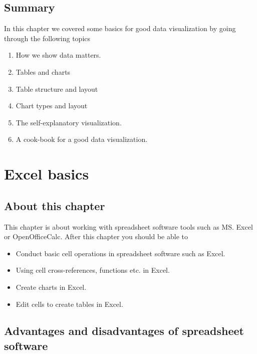 \documentclass[]{book}
\providecommand{\tightlist}{%
  \setlength{\itemsep}{0pt}\setlength{\parskip}{0pt}}
\begin{document}
\hypertarget{summary-11}{%
\section{Summary}\label{summary-11}}

In this chapter we covered some basics for good data visualization by going through the following topics

\begin{enumerate}
\def\labelenumi{\arabic{enumi}.}
\tightlist
\item
  How we show data matters.
\item
  Tables and charts
\item
  Table structure and layout
\item
  Chart types and layout
\item
  The self-explanatory visualization.
\item
  A cook-book for a good data visualization.
\end{enumerate}

\hypertarget{excel-basics}{%
\chapter{Excel basics}\label{excel-basics}}

\hypertarget{about-this-chapter-12}{%
\section{About this chapter}\label{about-this-chapter-12}}

This chapter is about working with spreadsheet software tools such as MS. Excel or OpenOfficeCalc. After this chapter you should be able to

\begin{itemize}
\tightlist
\item
  Conduct basic cell operations in spreadsheet software such as Excel.
\item
  Using cell cross-references, functions etc. in Excel.
\item
  Create charts in Excel.
\item
  Edit cells to create tables in Excel.
\end{itemize}

\hypertarget{advantages-and-disadvantages-of-spreadsheet-software}{%
\section{Advantages and disadvantages of spreadsheet software}\label{advantages-and-disadvantages-of-spreadsheet-software}}
\end{document}
